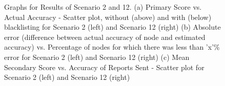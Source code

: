\documentclass[journal]{IEEEtran}
\begin{document}
\begin{figure}[!ht]
	\caption{Graphs for Results of Scenario 2 and 12. (a) Primary Score vs. Actual Accuracy - Scatter plot, without (above) and with (below) blacklisting for Scenario 2 (left) and Scenario 12 (right) (b) Absolute error (difference between actual accuracy of node and estimated accuracy) vs. Percentage of nodes for which there was less than 'x'\% error for Scenario 2 (left) and Scenario 12 (right) (c) Mean Secondary Score vs. Accuracy of Reports Sent - Scatter plot for Scenario 2 (left) and Scenario 12 (right)}
	\label{fig:apdx:ev2}
	\centering
\end{figure}
\end{document}
